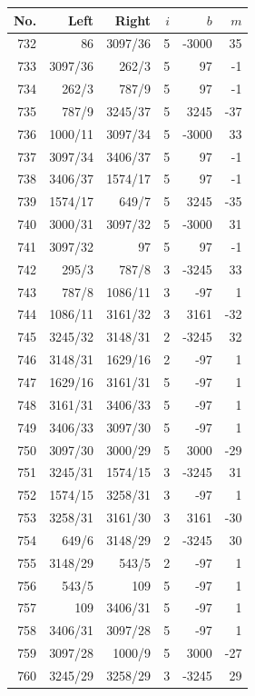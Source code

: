\documentclass[11pt,a4paper]{article}
\begin{document}
\begin{minipage}[t]{.49\linewidth}\centering\footnotesize\setlength{\tabcolsep}{2pt}\renewcommand{\arraystretch}{1.09}
\begin{tabular*}{\linewidth}{@{}r@{\extracolsep{\fill}}rrrrr@{}}\toprule
No. & Left & Right & $i$ & $b$ & $m$\\\midrule
732 & 86 & 3097/36 & 5 & -3000 & 35\\
733 & 3097/36 & 262/3 & 5 & 97 & -1\\
734 & 262/3 & 787/9 & 5 & 97 & -1\\
735 & 787/9 & 3245/37 & 5 & 3245 & -37\\
736 & 1000/11 & 3097/34 & 5 & -3000 & 33\\
737 & 3097/34 & 3406/37 & 5 & 97 & -1\\
738 & 3406/37 & 1574/17 & 5 & 97 & -1\\
739 & 1574/17 & 649/7 & 5 & 3245 & -35\\
740 & 3000/31 & 3097/32 & 5 & -3000 & 31\\
741 & 3097/32 & 97 & 5 & 97 & -1\\
742 & 295/3 & 787/8 & 3 & -3245 & 33\\
743 & 787/8 & 1086/11 & 3 & -97 & 1\\
744 & 1086/11 & 3161/32 & 3 & 3161 & -32\\
745 & 3245/32 & 3148/31 & 2 & -3245 & 32\\
746 & 3148/31 & 1629/16 & 2 & -97 & 1\\
747 & 1629/16 & 3161/31 & 5 & -97 & 1\\
748 & 3161/31 & 3406/33 & 5 & -97 & 1\\
749 & 3406/33 & 3097/30 & 5 & -97 & 1\\
750 & 3097/30 & 3000/29 & 5 & 3000 & -29\\
751 & 3245/31 & 1574/15 & 3 & -3245 & 31\\
752 & 1574/15 & 3258/31 & 3 & -97 & 1\\
753 & 3258/31 & 3161/30 & 3 & 3161 & -30\\
754 & 649/6 & 3148/29 & 2 & -3245 & 30\\
755 & 3148/29 & 543/5 & 2 & -97 & 1\\
756 & 543/5 & 109 & 5 & -97 & 1\\
757 & 109 & 3406/31 & 5 & -97 & 1\\
758 & 3406/31 & 3097/28 & 5 & -97 & 1\\
759 & 3097/28 & 1000/9 & 5 & 3000 & -27\\
760 & 3245/29 & 3258/29 & 3 & -3245 & 29\\

\end{tabular*}
\end{minipage}
\end{document}
